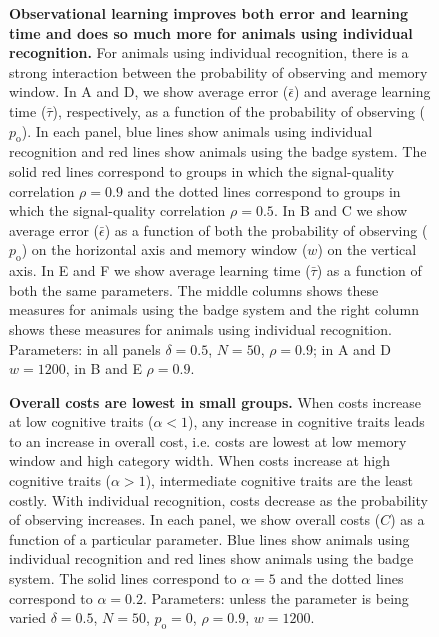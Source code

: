 \begin{figure}
\caption{\sffamily\small\textbf{Observational learning improves both error and learning time and does so much more for animals using individual recognition.} For animals using individual recognition, there is a strong interaction between the probability of observing and memory window. In A and D, we show average error ($\bar{\epsilon}$) and average learning time ($\bar{\tau}$), respectively, as a function of the probability of observing ($p_\text{o}$). In each panel, blue lines show animals using individual recognition and red lines show animals using the badge system. The solid red lines correspond to groups in which the signal-quality correlation $\rho=0.9$ and the dotted lines correspond to groups in which the signal-quality correlation $\rho=0.5$. In B and C we show average error ($\bar{\epsilon}$) as a function of both the probability of observing ($p_\text{o}$) on the horizontal axis and memory window ($w$) on the vertical axis. In E and F we show average learning time ($\bar{\tau}$) as a function of both the same parameters. The middle columns shows these measures for animals using the badge system and the right column shows these measures for animals using individual recognition. Parameters: in all panels $\delta = 0.5$, $N=50$, $\rho=0.9$; in A and D $w=1200$, in B and E $\rho=0.9$.}
\label{observational}
\end{figure}

\begin{figure}
\caption{\sffamily\small\textbf{Overall costs are lowest in small groups.} When costs increase at low cognitive traits ($\alpha<1$), any increase in cognitive traits leads to an increase in overall cost, i.e. costs are lowest at low memory window and high category width. When costs increase at high cognitive traits ($\alpha>1$), intermediate cognitive traits are the least costly.  With individual recognition, costs decrease as the probability of observing increases. In each panel, we show overall costs ($C$) as a function of a particular parameter. Blue lines show animals using individual recognition and red lines show animals using the badge system. The solid lines correspond to $\alpha=5$ and the dotted lines correspond to $\alpha=0.2$.  Parameters: unless the parameter is being varied $\delta = 0.5$, $N=50$, $p_\text{o}=0$, $\rho=0.9$, $w=1200$.}
\label{costs}
\end{figure}

